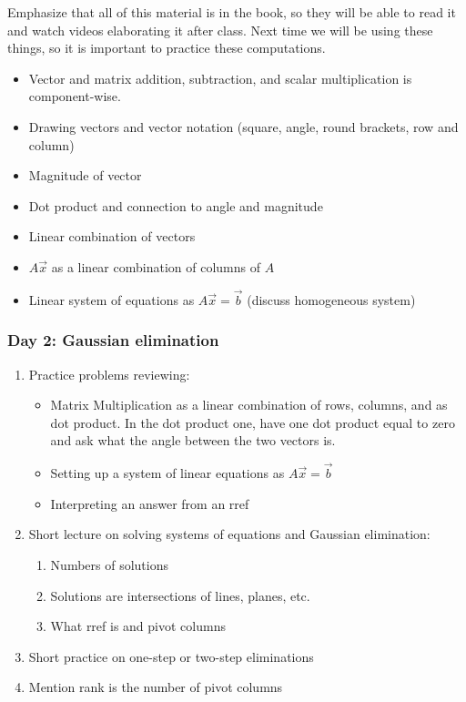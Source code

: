 Emphasize that all of this material is in the book, so they will be able to read it and watch videos elaborating it after class.  Next time we will be using these things, so it is important to practice these computations.

\begin{itemize}
\item Vector and matrix addition, subtraction, and scalar multiplication is component-wise.
\item Drawing vectors and vector notation (square, angle, round brackets, row and column)
\item Magnitude of vector
\item Dot product and connection to angle and magnitude
\item Linear combination of vectors
\item $A\vec x$ as a linear combination of columns of $A$
\item Linear system of equations as $A\vec x=\vec b$ (discuss homogeneous system)
\end{itemize}

\subsubsection*{Day 2: Gaussian elimination}
\label{sec:day-2:-gaussian}

\begin{enumerate}
\item Practice problems reviewing:
\begin{itemize}
\item Matrix Multiplication as a linear combination of rows, columns, and as dot product.  In the dot product one, have one dot product equal to zero and ask what the angle between the two vectors is.
\item Setting up a system of linear equations as $A\vec x=\vec b$
\item Interpreting an answer from an rref
\end{itemize}
\item Short lecture on solving systems of equations and Gaussian elimination:
  \begin{enumerate}
  \item Numbers of solutions
  \item Solutions are intersections of lines, planes, etc.
  \item What rref is and pivot columns
  \end{enumerate}
\item Short practice on one-step or two-step eliminations
\item Mention rank is the number of pivot columns
\end{enumerate}

